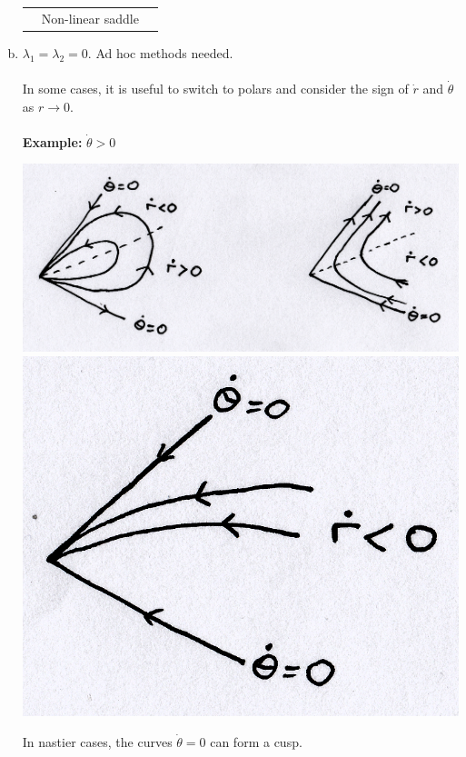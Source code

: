 \documentclass{article}
\begin{document}
\begin{enumerate}[(a)]
\begin{center}
\begin{tabular}{ m{3cm} m{3cm} m{3cm}  }
& Non-linear saddle
\end{tabular}
\end{center}
\item $\lambda_1 = \lambda_2 = 0$. Ad hoc methods needed.
\\
\\
In some cases, it is useful to switch to polars and consider the sign of
$\dot{r}$ and $\dot{\theta}$ as $r \to 0$.
\\
\\
\textbf{Example:} $\dot{\theta} >0$ \\
\begin{center}
\includegraphics[scale = 0.15]{fig17.png} \\
\includegraphics[scale = 0.16]{fig18.png}
\end{center}
In nastier cases, the curves $\dot{\theta} = 0$ can form a cusp.
\begin{center}

\end{center}
\end{enumerate}
\end{document}
